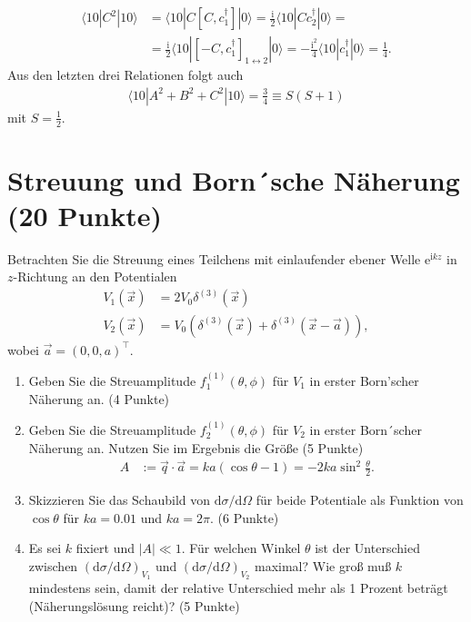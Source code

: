 \documentclass[german, parskip=full]{scrartcl}
\newcommand{\braket}{}
\newcommand{\kla}{}
\newcommand{\klam}{}
\newcommand{\tecxt}{}
\newcommand{\I}{\text{i}}
\newcommand{\e}{\text{e}}
\begin{document}
\begin{enumerate}
\begin{align*}
\braket\langle {10} | {C^2} | {10}\rangle&=\braket\langle {10} | {C\klam\left[ {C,c_1^\dagger} \right]} | {0}\rangle=\frac{\I}{2}\braket\langle {10} | {Cc_2^\dagger} | {0}\rangle=\\
&=\frac{\I}{2}\braket\langle {10} | {\klam\left[ {-C,c_1^\dagger} \right]_{1\leftrightarrow 2}} | {0}\rangle=-\frac{\I^2}{4}\braket\langle {10} | {c_1^\dagger} | {0}\rangle=\frac{1}{4}.
\end{align*}
Aus den letzten drei Relationen folgt auch 
\begin{align*}
\braket\langle {10} | {A^2+B^2+C^2} | {10}\rangle=\frac{3}{4}\equiv S(S+1)
\end{align*}
mit $S=\frac{1}{2}$.
\end{enumerate}
\newpage
\section{Streuung und Born´sche Näherung (20 Punkte)}
Betrachten Sie die Streuung eines Teilchens mit einlaufender ebener Welle $\e^{\I kz}$ in $z$-Richtung an den Potentialen
\begin{align}
V_1(\vec{x})&=2V_0\delta^{(3)}(\vec{x})\\
V_2(\vec{x})&=V_0\kla\left( {\delta^{(3)}(\vec{x})+\delta^{(3)}(\vec{x}-\vec{a})} \right),
\end{align}
wobei $\vec{a}=(0,0,a)^\top$.
\begin{enumerate}
\item[a)] Geben Sie die Streuamplitude $f_1^{(1)}(\theta,\phi)$ für $V_1$ in erster Born'scher Näherung an. (4 Punkte)
\item[b)] Geben Sie die Streuamplitude $f_2^{(1)}(\theta,\phi)$ für $V_2$ in erster Born´scher Näherung an. 
Nutzen Sie im Ergebnis die Größe \hfill (5 Punkte)
\begin{align}
A&:=\vec{q}\cdot\vec{a}=ka(\cos\theta -1)=-2ka\sin^2\frac{\theta}{2}.
\end{align}
\item[c)] Skizzieren Sie das Schaubild von $\tecxt\text{d}\sigma / \tecxt\text{d}\Omega$ für beide Potentiale als Funktion von $\cos\theta$ für $ka=0.01$ und $ka=2\pi$. (6 Punkte)
\item[d)] Es sei $k$ fixiert und $|A|\ll 1$. 
Für welchen Winkel $\theta$ ist der Unterschied zwischen $(\tecxt\text{d}\sigma / \tecxt\text{d}\Omega)_{V_1}$ und $(\tecxt\text{d}\sigma / \tecxt\text{d}\Omega)_{V_2}$ maximal?
Wie groß muß $k$ mindestens sein, damit der relative Unterschied mehr als 1 Prozent beträgt (Näherungslösung reicht)? (5 Punkte)
\end{enumerate}
\newpage
\end{document}
